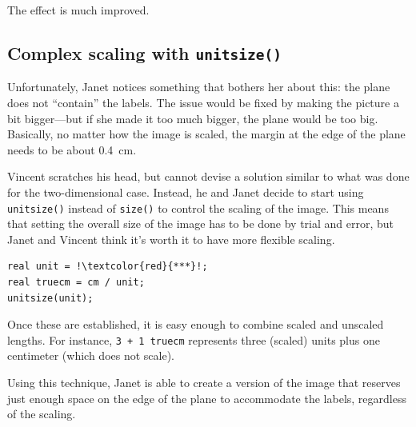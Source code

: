 \documentclass{article}
\begin{document}
The effect is much improved.

\subsection{Complex scaling with \texttt{unitsize()}}
%
Unfortunately, Janet notices something that bothers her about this: the plane does not
``contain'' the labels. The issue would be fixed by making the picture a bit bigger---but
if she made it too much bigger, the plane would be too big. Basically, no matter how the
image is scaled, the margin at the edge of the plane needs to be about 0.4~cm.

Vincent scratches his head, but cannot devise a solution similar to what was done
for the two-dimensional case. Instead, he and Janet decide to start using
\texttt{unitsize()} instead of \texttt{size()} to control the scaling of the image.
This means that setting the overall size of the image has to be done by trial and error,
but Janet and Vincent think it's worth it to have more flexible scaling.

\begin{lstlisting}[escapechar=!]
real unit = !\textcolor{red}{***}!;
real truecm = cm / unit;
unitsize(unit);
\end{lstlisting}

Once these are established, it is easy enough to combine scaled and unscaled lengths.
For instance, \texttt{3 + 1 truecm} represents three (scaled) units plus one centimeter
(which does not scale).

Using this technique, Janet is able to create a version of the image that reserves just
enough space on the edge of the plane to accommodate the labels, regardless of the 
scaling.
\end{document}
